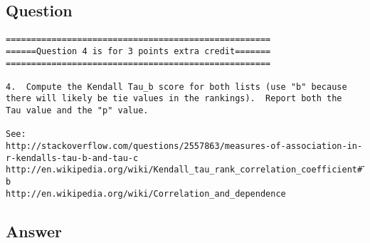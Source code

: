\documentclass[letterpaper,11pt]{article}
\begin{document}
\subsection*{Question}

\begin{verbatim}
====================================================
======Question 4 is for 3 points extra credit=======
====================================================

4.  Compute the Kendall Tau_b score for both lists (use "b" because
there will likely be tie values in the rankings).  Report both the
Tau value and the "p" value.

See: 
http://stackoverflow.com/questions/2557863/measures-of-association-in-r-kendalls-tau-b-and-tau-c
http://en.wikipedia.org/wiki/Kendall_tau_rank_correlation_coefficient#Tau-b
http://en.wikipedia.org/wiki/Correlation_and_dependence
\end{verbatim}

\newpage
\subsection*{Answer}

\newpage


\end{document}
